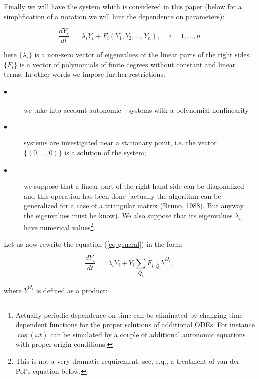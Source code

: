 Finally we will have the system which is considered in this
paper (below for a simplification of a notation we will hint the 
dependence on parameters):

\begin{equation}
\label{eq-general}
\frac{dY_i}{dt}\ =\ \lambda_iY_i+F_i(Y_1,Y_2,\ldots,Y_n),
\quad \ i=1,\ldots ,n
\end{equation}

\noindent
here  $\{\lambda_i\}$ is a non-zero vector of eigenvalues of the linear 
parts of the right sides.  $\{F_i\}$ is a vector of polynomials of 
finite degrees without constant and linear terms. In other words we 
impose further restrictions:

\begin{description} 
\item[$\bullet$]
    we  take into account autonomic \footnote{Actually
periodic dependence on time can be eliminated by changing time
dependent functions for the proper solutions of additional ODEs. For 
instance $\cos(\omega t)$ can be simulated by a couple of additional 
autonomic equations with proper origin conditions.}
systems with a polynomial nonlinearity 

\item[$\bullet$]
    systems are  investigated near a stationary point,  i.e.  the 
vector $\{(0,\ldots,0)\}$ is a solution of the system;

\item[$\bullet$]
    we  suppose that a linear part of the right hand side can be 
    diagonalized  and this  operation  has  been  done (actually  
    the  algorithm  can  be  
generalized for a case of a triangular matrix (Bruno, 1988).
But anyway the eigenvalues must be know). We also suppose that 
its eigenvalues $\lambda_i$ have numerical values\footnote{This is 
not a very dramatic requirement, see, e.q., a treatment of van der 
Pol's equation below.}.

\end{description} 

    Let us now rewrite the equation (\ref{eq-general}) in the form:
    
\begin{equation}
\label{eq-bform}
\frac{dY_i}{dt}\ =\ \lambda_i Y_i+Y_i \sum_{\overline{Q}_i}
F_{i,\overline{Q}_i}\overline{Y}^{\overline{Q}_i},
\end{equation}

\noindent
where $\overline{Y}^{\overline{Q}_i}$ is defined as a product:

